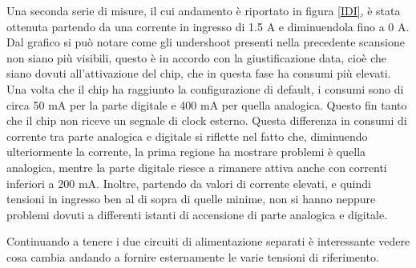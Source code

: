 Una seconda serie di misure, il cui andamento è riportato in figura \ref{IDI}, è stata ottenuta partendo da una corrente in ingresso di 1.5 A e diminuendola fino a 0 A. 
Dal grafico si può notare come gli undershoot presenti nella precedente scansione non siano più visibili, questo è in accordo con la giustificazione data, cioè che siano dovuti all'attivazione del chip, che in questa fase ha consumi più elevati. 
Una volta che il chip ha raggiunto la configurazione di default, i consumi sono di circa 50 mA per la parte digitale e 400 mA per quella analogica. Questo fin tanto che il chip non riceve un segnale di clock esterno. 
Questa differenza in consumi di corrente tra parte analogica e digitale si riflette nel fatto che, diminuendo ulteriormente la corrente, la prima regione ha mostrare problemi è quella analogica, mentre la parte digitale riesce a rimanere attiva anche con correnti inferiori a 200 mA. 
Inoltre, partendo da valori di corrente elevati, e quindi tensioni in ingresso ben al di sopra di quelle minime, non si hanno neppure problemi dovuti a differenti istanti di accensione di parte analogica e digitale.
% 
%
%

Continuando a tenere i due circuiti di alimentazione separati è interessante vedere cosa cambia andando a fornire esternamente le varie tensioni di riferimento.

